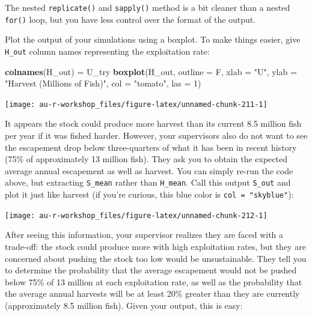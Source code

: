 \documentclass[]{book}
\newenvironment{Shaded}{\begin{snugshade}}{\end{snugshade}}
\newcommand{\DataTypeTok}[1]{\textcolor[rgb]{0.13,0.29,0.53}{#1}}
\newcommand{\DecValTok}[1]{\textcolor[rgb]{0.00,0.00,0.81}{#1}}
\newcommand{\KeywordTok}[1]{\textcolor[rgb]{0.13,0.29,0.53}{\textbf{#1}}}
\newcommand{\NormalTok}[1]{#1}
\newcommand{\StringTok}[1]{\textcolor[rgb]{0.31,0.60,0.02}{#1}}
\begin{document}
The nested \texttt{replicate()} and \texttt{sapply()} method is a bit cleaner than a nested \texttt{for()} loop, but you have less control over the format of the output.

Plot the output of your simulations using a boxplot. To make things easier, give \texttt{H\_out} column names representing the exploitation rate:

\begin{Shaded}
\begin{Highlighting}[]
\KeywordTok{colnames}\NormalTok{(H_out) =}\StringTok{ }\NormalTok{U_try}
\KeywordTok{boxplot}\NormalTok{(H_out, }\DataTypeTok{outline =}\NormalTok{ F,}
        \DataTypeTok{xlab =} \StringTok{"U"}\NormalTok{, }\DataTypeTok{ylab =} \StringTok{"Harvest (Millions of Fish)"}\NormalTok{,}
        \DataTypeTok{col =} \StringTok{"tomato"}\NormalTok{, }\DataTypeTok{las =} \DecValTok{1}\NormalTok{)}
\end{Highlighting}
\end{Shaded}

\begin{center}\texttt{[image: au-r-workshop\_files/figure-latex/unnamed-chunk-211-1]} \end{center}

It appears the stock could produce more harvest than its current 8.5 million fish per year if it was fished harder. However, your supervisors also do not want to see the escapement drop below three-quarters of what it has been in recent history (75\% of approximately 13 million fish). They ask you to obtain the expected average annual escapement as well as harvest. You can simply re-run the code above, but extracting \texttt{S\_mean} rather than \texttt{H\_mean}. Call this output \texttt{S\_out} and plot it just like harvest (if you're curious, this blue color is \texttt{col\ =\ "skyblue"}):

\begin{center}\texttt{[image: au-r-workshop\_files/figure-latex/unnamed-chunk-212-1]} \end{center}

After seeing this information, your supervisor realizes they are faced with a trade-off: the stock could produce more with high exploitation rates, but they are concerned about pushing the stock too low would be unsustainable. They tell you to determine the probability that the average escapement would not be pushed below 75\% of 13 million at each exploitation rate, as well as the probability that the average annual harvests will be at least 20\% greater than they are currently (approximately 8.5 million fish). Given your output, this is easy:
\end{document}
